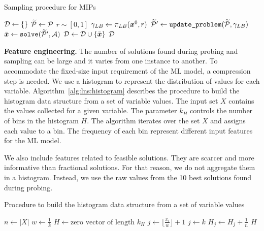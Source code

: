 \documentclass[3p, authoryear, times]{elsarticle}
\begin{document}
\begin{algorithm}[H]
    \caption{Sampling procedure for MIPs}\label{alg:lns:spl}
    \begin{algorithmic}[1]

    \State $\mathcal{D} \gets \{ \}$ 
    \State $\widetilde{\mathcal{P}} \gets \mathcal{P}$ 
        \State $r\sim [0, 1]$ 
        \State $\gamma_{LB} \gets \pi_{LB}(\boldsymbol{x}^0, r)$ 
        \State $ \Plin' \gets \varname{update_problem}(\Plin , \gamma_{LB})$ 
        \State $\xbbar \gets \varname{solve}(\Plin', \biga)$ 
        \State $\mathcal{D} \gets \mathcal{D} \cup \{ \bar{\boldsymbol{x}} \}$ 
    \EndWhile
    \State \Return $\mathcal{D}$
    \EndProcedure
    \end{algorithmic} 
\end{algorithm} 

\textbf{Feature engineering.} The number of solutions found during probing and sampling can be large and it varies from one instance to another. To accommodate the fixed-size input requirement of the ML model, a compression step is needed. We use a histogram to represent the distribution of values for each variable. Algorithm~\ref{alg:lns:histogram} describes the procedure to build the histogram data structure from a set of variable values. The input set $X$ contains the values collected for a given variable. The parameter $k_H$ controls the number of bins in the histogram $H$. The algorithm iterates over the set $X$ and assigns each value to a bin. The frequency of each bin represent different input features for the ML model. 

We also include features related to feasible solutions. They are scarcer and more informative than fractional solutions. For that reason, we do not aggregate them in a histogram. Instead, we use the raw values from the 10 best solutions found during probing. 
\begin{algorithm}
    \caption{Procedure to build the histogram data structure from a set of variable values}\label{alg:lns:histogram}
    \begin{algorithmic}[1]
        \State $n \gets |X|$ 
        \State $w \gets \frac{1}{k}$ 
        \State $H \gets \text{zero vector of length } k_H$ 
            \State $j \gets \lfloor \frac{x_i}{w} \rfloor + 1$ 
                \State $j \gets k$ 
            \EndIf
            \State $H_j \gets H_j + \frac{1}{n}$ 
        \EndFor
        \State \Return $H$
    \EndProcedure
    \end{algorithmic}
\end{algorithm}
    
\end{document}
